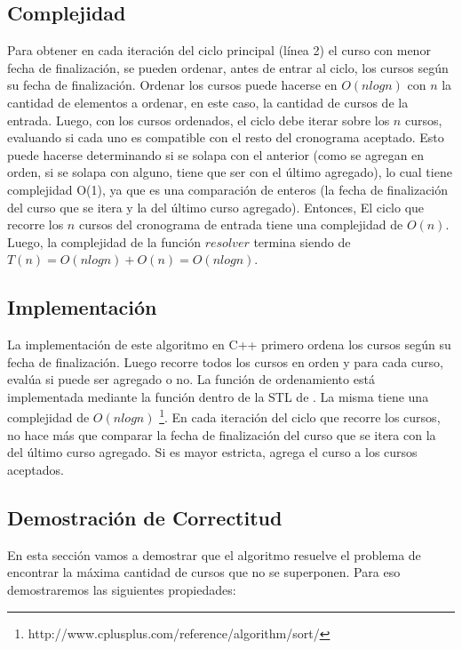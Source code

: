 \subsection{Complejidad}
\par{Para obtener en cada iteraci\'on del ciclo principal (l\'inea 2) el curso con menor fecha de finalizaci\'on, se pueden ordenar, antes de entrar al ciclo, los cursos seg\'un su fecha de finalizaci\'on. Ordenar los cursos puede hacerse en $O(n log n)$ con $n$ la cantidad de elementos a ordenar, en este caso, la cantidad de cursos de la entrada. Luego, con los cursos ordenados, el ciclo debe iterar sobre los $n$ cursos, evaluando si cada uno es compatible con el resto del cronograma aceptado. Esto puede hacerse determinando si se solapa con el anterior (como se agregan en orden, si se solapa con alguno, tiene que ser con el \'ultimo agregado), lo cual tiene complejidad O(1), ya que es una comparaci\'on de enteros (la fecha de finalizaci\'on del curso que se itera y la del \'ultimo curso agregado). Entonces, El ciclo que recorre los $n$ cursos del cronograma de entrada tiene una complejidad de $O(n)$. Luego, la complejidad de la función $resolver$ termina siendo de $T(n) = O(n log n) + O(n) = O(n log n)$.}

\subsection{Implementaci\'on}
\par{La implementaci\'on de este algoritmo en C++ primero ordena los cursos seg\'un su fecha de finalizaci\'on. Luego recorre todos los cursos en orden y para cada curso, eval\'ua si puede ser agregado o no. La función de ordenamiento está implementada mediante la función  dentro de la STL de . La misma tiene una complejidad de $O(n log n)$ \footnote{http://www.cplusplus.com/reference/algorithm/sort/}. En cada iteraci\'on del ciclo que recorre los cursos, no hace m\'as que comparar la fecha de finalizaci\'on del curso que se itera con la del \'ultimo curso agregado. Si es mayor estricta, agrega el curso a los cursos aceptados.}

\subsection{Demostraci\'on de Correctitud}
\par{En esta secci\'on vamos a demostrar que el algoritmo resuelve el problema de encontrar la m\'axima cantidad de cursos que no se superponen.
Para eso demostraremos las siguientes propiedades:}

